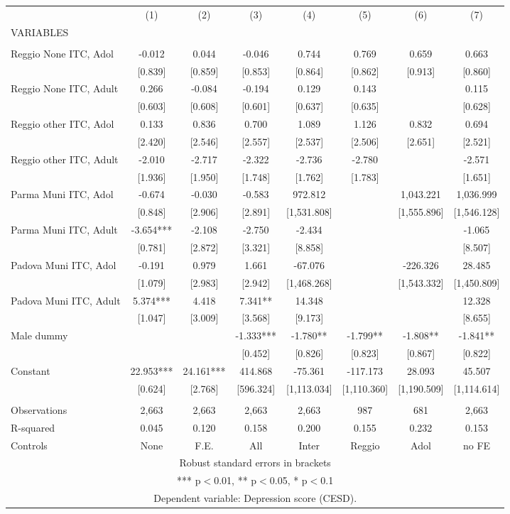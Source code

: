 \begin{tabular}{lccccccc} \hline
 & (1) & (2) & (3) & (4) & (5) & (6) & (7) \\
VARIABLES &  &  &  &  &  &  &  \\ \hline
 &  &  &  &  &  &  &  \\
Reggio None ITC, Adol & -0.012 & 0.044 & -0.046 & 0.744 & 0.769 & 0.659 & 0.663 \\
 & [0.839] & [0.859] & [0.853] & [0.864] & [0.862] & [0.913] & [0.860] \\
Reggio None ITC, Adult & 0.266 & -0.084 & -0.194 & 0.129 & 0.143 &  & 0.115 \\
 & [0.603] & [0.608] & [0.601] & [0.637] & [0.635] &  & [0.628] \\
Reggio other ITC, Adol & 0.133 & 0.836 & 0.700 & 1.089 & 1.126 & 0.832 & 0.694 \\
 & [2.420] & [2.546] & [2.557] & [2.537] & [2.506] & [2.651] & [2.521] \\
Reggio other ITC, Adult & -2.010 & -2.717 & -2.322 & -2.736 & -2.780 &  & -2.571 \\
 & [1.936] & [1.950] & [1.748] & [1.762] & [1.783] &  & [1.651] \\
Parma Muni ITC, Adol & -0.674 & -0.030 & -0.583 & 972.812 &  & 1,043.221 & 1,036.999 \\
 & [0.848] & [2.906] & [2.891] & [1,531.808] &  & [1,555.896] & [1,546.128] \\
Parma Muni ITC, Adult & -3.654*** & -2.108 & -2.750 & -2.434 &  &  & -1.065 \\
 & [0.781] & [2.872] & [3.321] & [8.858] &  &  & [8.507] \\
Padova Muni ITC, Adol & -0.191 & 0.979 & 1.661 & -67.076 &  & -226.326 & 28.485 \\
 & [1.079] & [2.983] & [2.942] & [1,468.268] &  & [1,543.332] & [1,450.809] \\
Padova Muni ITC, Adult & 5.374*** & 4.418 & 7.341** & 14.348 &  &  & 12.328 \\
 & [1.047] & [3.009] & [3.568] & [9.173] &  &  & [8.655] \\
Male dummy &  &  & -1.333*** & -1.780** & -1.799** & -1.808** & -1.841** \\
 &  &  & [0.452] & [0.826] & [0.823] & [0.867] & [0.822] \\
Constant & 22.953*** & 24.161*** & 414.868 & -75.361 & -117.173 & 28.093 & 45.507 \\
 & [0.624] & [2.768] & [596.324] & [1,113.034] & [1,110.360] & [1,190.509] & [1,114.614] \\
 &  &  &  &  &  &  &  \\
Observations & 2,663 & 2,663 & 2,663 & 2,663 & 987 & 681 & 2,663 \\
R-squared & 0.045 & 0.120 & 0.158 & 0.200 & 0.155 & 0.232 & 0.153 \\
 Controls & None & F.E. & All & Inter & Reggio & Adol & no FE \\ \hline
\multicolumn{8}{c}{ Robust standard errors in brackets} \\
\multicolumn{8}{c}{ *** p$<$0.01, ** p$<$0.05, * p$<$0.1} \\
\multicolumn{8}{c}{ Dependent variable: Depression score (CESD).} \\
\end{tabular}
